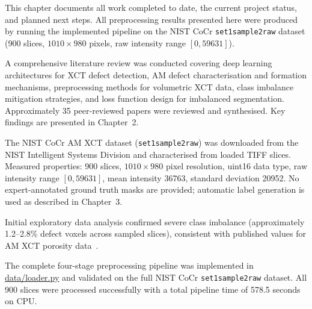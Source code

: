 
This chapter documents all work completed to date, the current project status, and planned next
steps. All preprocessing results presented here were produced by running the implemented pipeline on
the NIST CoCr \texttt{set1sample2raw} dataset (900 slices, $1010 \times 980$ pixels, raw intensity
range $[0, 59631]$).

\newcommand{\figplaceholder}[2]{%
  \begin{figure}[htbp]
  \centering
  \fbox{\parbox{0.85\linewidth}{\centering\vspace{2.2cm}
    \textbf{[#1]}\\[4pt]
    {\small\itshape #2}
    \vspace{2.2cm}}}
  \end{figure}%
}

A comprehensive literature review was conducted covering deep learning architectures for XCT defect
detection, AM defect characterisation and formation mechanisms, preprocessing methods for volumetric
XCT data, class imbalance mitigation strategies, and loss function design for imbalanced
segmentation. Approximately 35 peer-reviewed papers were reviewed and synthesised. Key findings are
presented in Chapter~2.

The NIST CoCr AM XCT dataset (\texttt{set1sample2raw}) was downloaded from the NIST Intelligent
Systems Division and characterised from loaded TIFF slices. Measured properties: 900 slices,
$1010 \times 980$ pixel resolution, uint16 data type, raw intensity range $[0, 59631]$, mean
intensity 36763, standard deviation 20952. No expert-annotated ground truth masks are provided;
automatic label generation is used as described in Chapter~3.

Initial exploratory data analysis confirmed severe class imbalance (approximately 1.2--2.8\% defect
voxels across sampled slices), consistent with published values for AM XCT porosity
data~\citep{Sudre2017}.

The complete four-stage preprocessing pipeline was implemented in \url{data/loader.py} and
validated on the full NIST CoCr \texttt{set1sample2raw} dataset. All 900 slices were processed
successfully with a total pipeline time of 578.5 seconds on CPU.

